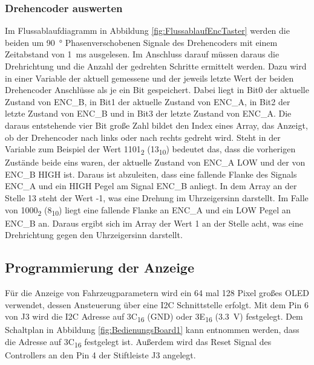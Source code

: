 \subsubsection{Drehencoder auswerten}\label{sec:Drehencoder}
Im Flussablaufdiagramm in Abbildung \ref{fig:FlussablaufEncTaster} werden die beiden um \SI{90}{\degree} Phasenverschobenen Signale des Drehencoders mit einem Zeitabstand von \SI{1}{\milli\second} ausgelesen. Im Anschluss darauf müssen daraus die Drehrichtung und die Anzahl der gedrehten Schritte ermittelt werden. Dazu wird in einer Variable der aktuell gemessene und der jeweils letzte Wert der beiden Drehencoder Anschlüsse als je ein Bit gespeichert. Dabei liegt in Bit0 der aktuelle Zustand von ENC\_B, in Bit1 der aktuelle Zustand von ENC\_A, in Bit2 der letzte Zustand von ENC\_B und in Bit3 der letzte Zustand von ENC\_A. Die daraus entstehende vier Bit große Zahl bildet den Index eines Array, das Anzeigt, ob der Drehencoder nach links oder nach rechts gedreht wird. Steht in der Variable zum Beispiel der Wert 1101\textsubscript{2} (13\textsubscript{10}) bedeutet das, dass die vorherigen Zustände beide eins waren, der aktuelle Zustand von ENC\_A LOW und der von ENC\_B HIGH ist. Daraus ist abzuleiten, dass eine fallende Flanke des Signals ENC\_A und ein HIGH Pegel am Signal ENC\_B anliegt. In dem Array an der Stelle 13 steht der Wert -1, was eine Drehung im Uhrzeigersinn darstellt. Im Falle von 1000\textsubscript{2} (8\textsubscript{10}) liegt eine fallende Flanke an ENC\_A und ein LOW Pegel an ENC\_B an. Daraus ergibt sich im Array der Wert 1 an der Stelle acht, was eine Drehrichtung gegen den Uhrzeigersinn darstellt.
\newpage
\subsection{Programmierung der Anzeige}\label{Sec6Sub2}
Für die Anzeige von Fahrzeugparametern wird ein 64 mal 128 Pixel großes \ac{OLED} verwendet, dessen Ansteuerung über eine \ac{I2C} Schnittstelle erfolgt.  Mit dem Pin 6 von J3 wird die \ac{I2C} Adresse auf 3C\textsubscript{16} (GND) oder 3E\textsubscript{16} (\SI{3,3}{\volt}) festgelegt. Dem Schaltplan in Abbildung \ref{fig:BedienungsBoard1} kann entnommen werden, dass die Adresse auf 3C\textsubscript{16} festgelegt ist. Außerdem wird das Reset Signal des Controllers an den Pin 4 der Stiftleiste J3 angelegt.

